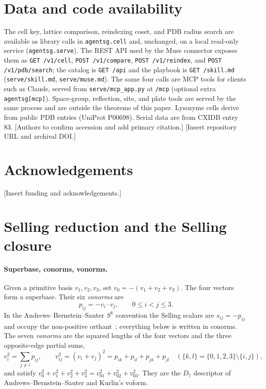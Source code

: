 \documentclass[11pt]{article}
\begin{document}
\section*{Data and code availability}
The cell key, lattice comparison, reindexing coset, and PDB radius search are available as library calls in \texttt{agentsg.cell} and, unchanged, on a local read-only service (\texttt{agentsg.serve}). The REST API used by the Muse connector exposes them as \texttt{GET /v1/cell}, \texttt{POST /v1/compare}, \texttt{POST /v1/reindex}, and \texttt{POST /v1/pdb/search}; the catalog is \texttt{GET /api} and the playbook is \texttt{GET /skill.md} (\texttt{serve/skill.md}, \texttt{serve/muse.md}). The same four calls are MCP tools for clients such as Claude, served from \texttt{serve/mcp\_app.py} at \texttt{/mcp} (optional extra \texttt{agentsg[mcp]}). Space-group, reflection, site, and plate tools are served by the same process and are outside the theorems of this paper. Lysozyme cells derive from public PDB entries (UniProt P00698). Serial data are from CXIDB entry 83. [Authors to confirm accession and add primary citation.] [Insert repository URL and archival DOI.]

\section*{Acknowledgements}
[Insert funding and acknowledgements.]

\appendix

\section{Selling reduction and the Selling closure}
\label{app:closure}

\paragraph{Superbase, conorms, vonorms.}
Given a primitive basis $v_1,v_2,v_3$, set $v_0=-(v_1+v_2+v_3)$. The four vectors form a superbase. Their six \emph{conorms} are
\[
p_{ij}=-v_i\cdot v_j,\qquad 0\le i<j\le3 .
\]
In the Andrews--Bernstein--Sauter $S^6$ convention the Selling scalars are $s_{ij}=-p_{ij}$ and occupy the non-positive orthant~\cite{abs2019}; everything below is written in conorms. The seven \emph{vonorms} are the squared lengths of the four vectors and the three opposite-edge partial sums,
\[
v_i^2=\sum_{j\ne i}p_{ij},\qquad v_{ij}^2=(v_i+v_j)^2=p_{ik}+p_{il}+p_{jk}+p_{jl}\quad(\{k,l\}=\{0,1,2,3\}\setminus\{i,j\}),
\]
and satisfy $v_0^2+v_1^2+v_2^2+v_3^2=v_{01}^2+v_{02}^2+v_{03}^2$. They are the $D_7$ descriptor of Andrews--Bernstein--Sauter and Kurlin's voform.
\end{document}
